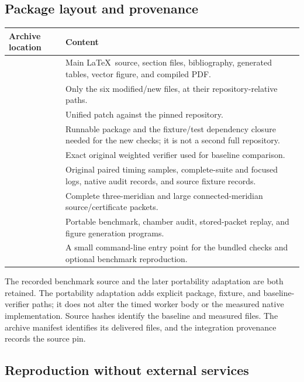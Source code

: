 \subsection{Package layout and provenance}

\begin{longtable}{L{0.42\textwidth}L{0.50\textwidth}}
\toprule
Archive location & Content\\
\midrule
\endhead
{} &
Main \LaTeX\ source, section files, bibliography, generated tables,
vector figure, and compiled PDF.\\
\addlinespace
{} &
Only the six modified/new files, at their repository-relative paths.\\
\addlinespace
{} &
Unified patch against the pinned repository.\\
\addlinespace
{} &
Runnable package and the fixture/test dependency closure needed for the
new checks; it is not a second full repository.\\
\addlinespace
{} &
Exact original weighted verifier used for baseline comparison.\\
\addlinespace
{} &
Original paired timing samples, complete-suite and focused logs,
native audit records, and source fixture records.\\
\addlinespace
{} &
Complete three-meridian and large connected-meridian source/certificate
packets.\\
\addlinespace
{} &
Portable benchmark, chamber audit, stored-packet replay, and figure
generation programs.\\
\addlinespace
{} &
A small command-line entry point for the bundled checks and optional
benchmark reproduction.\\
\bottomrule
\end{longtable}

The recorded benchmark source and the later portability adaptation are
both retained. The portability adaptation adds explicit package,
fixture, and baseline-verifier paths; it does not alter the timed worker
body or the measured native implementation. Source hashes identify the
baseline and measured files. The archive manifest identifies its
delivered files, and the integration provenance records the source pin.

\subsection{Reproduction without external services}

